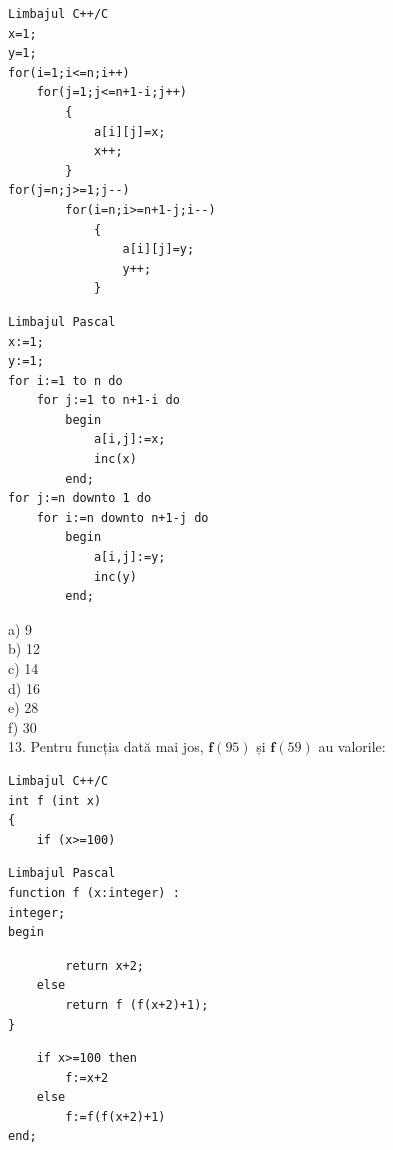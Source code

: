 \documentclass[10pt]{article}
\begin{document}
\begin{verbatim}
Limbajul C++/C
x=1;
y=1;
for(i=1;i<=n;i++)
    for(j=1;j<=n+1-i;j++)
        {
            a[i][j]=x;
            x++;
        }
for(j=n;j>=1;j--)
        for(i=n;i>=n+1-j;i--)
            {
                a[i][j]=y;
                y++;
            }
\end{verbatim}

\begin{verbatim}
Limbajul Pascal
x:=1;
y:=1;
for i:=1 to n do
    for j:=1 to n+1-i do
        begin
            a[i,j]:=x;
            inc(x)
        end;
for j:=n downto 1 do
    for i:=n downto n+1-j do
        begin
            a[i,j]:=y;
            inc(y)
        end;
\end{verbatim}

a) 9\\
b) 12\\
c) 14\\
d) 16\\
e) 28\\
f) 30\\
13. Pentru funcția dată mai jos, $\mathbf{f}(95)$ și $\mathbf{f}(59)$ au valorile:

\begin{verbatim}
Limbajul C++/C
int f (int x)
{
    if (x>=100)
\end{verbatim}

\begin{verbatim}
Limbajul Pascal
function f (x:integer) :
integer;
begin
\end{verbatim}

\begin{verbatim}
        return x+2;
    else
        return f (f(x+2)+1);
}
\end{verbatim}

\begin{verbatim}
    if x>=100 then
        f:=x+2
    else
        f:=f(f(x+2)+1)
end;
\end{verbatim}
\end{document}
